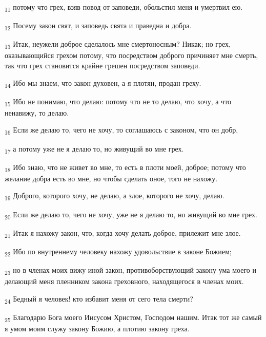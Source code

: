 \begin{tcolorbox}
\textsubscript{11} потому что грех, взяв повод от заповеди, обольстил меня и умертвил ею.
\end{tcolorbox}
\begin{tcolorbox}
\textsubscript{12} Посему закон свят, и заповедь свята и праведна и добра.
\end{tcolorbox}
\begin{tcolorbox}
\textsubscript{13} Итак, неужели доброе сделалось мне смертоносным? Никак; но грех, оказывающийся грехом потому, что посредством доброго причиняет мне смерть, так что грех становится крайне грешен посредством заповеди.
\end{tcolorbox}
\begin{tcolorbox}
\textsubscript{14} Ибо мы знаем, что закон духовен, а я плотян, продан греху.
\end{tcolorbox}
\begin{tcolorbox}
\textsubscript{15} Ибо не понимаю, что делаю: потому что не то делаю, что хочу, а что ненавижу, то делаю.
\end{tcolorbox}
\begin{tcolorbox}
\textsubscript{16} Если же делаю то, чего не хочу, то соглашаюсь с законом, что он добр,
\end{tcolorbox}
\begin{tcolorbox}
\textsubscript{17} а потому уже не я делаю то, но живущий во мне грех.
\end{tcolorbox}
\begin{tcolorbox}
\textsubscript{18} Ибо знаю, что не живет во мне, то есть в плоти моей, доброе; потому что желание добра есть во мне, но чтобы сделать оное, того не нахожу.
\end{tcolorbox}
\begin{tcolorbox}
\textsubscript{19} Доброго, которого хочу, не делаю, а злое, которого не хочу, делаю.
\end{tcolorbox}
\begin{tcolorbox}
\textsubscript{20} Если же делаю то, чего не хочу, уже не я делаю то, но живущий во мне грех.
\end{tcolorbox}
\begin{tcolorbox}
\textsubscript{21} Итак я нахожу закон, что, когда хочу делать доброе, прилежит мне злое.
\end{tcolorbox}
\begin{tcolorbox}
\textsubscript{22} Ибо по внутреннему человеку нахожу удовольствие в законе Божием;
\end{tcolorbox}
\begin{tcolorbox}
\textsubscript{23} но в членах моих вижу иной закон, противоборствующий закону ума моего и делающий меня пленником закона греховного, находящегося в членах моих.
\end{tcolorbox}
\begin{tcolorbox}
\textsubscript{24} Бедный я человек! кто избавит меня от сего тела смерти?
\end{tcolorbox}
\begin{tcolorbox}
\textsubscript{25} Благодарю Бога моего Иисусом Христом, Господом нашим. Итак тот же самый я умом моим служу закону Божию, а плотию закону греха.
\end{tcolorbox}
